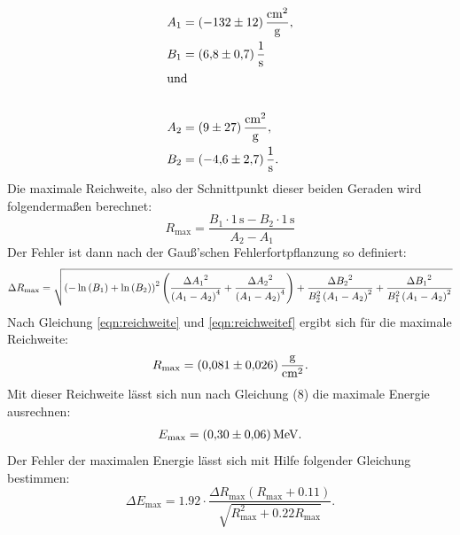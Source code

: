 \begin{align*}
A_1 &= (\num{-132 +- 12})\,\frac{\si{\centi\meter\squared}}{\si{\gram}} ,\\
B_1 &= (\num{6.8 +- 0.7})\,\frac{1}{\si{\second}} \\
\intertext{und} \\
A_2 &= (\num{9 +- 27})\,\frac{\si{\centi\meter\squared}}{\si{\gram}} ,\\
B_2 &= (\num{-4.6 +- 2.7})\,\frac{1}{\si{\second}}.
\end{align*}
Die maximale Reichweite, also der Schnittpunkt dieser beiden Geraden wird folgendermaßen berechnet:
\begin{equation}
  \label{eqn:reichweite}
R_\text{max} = \frac{B_1 \cdot 1\,\si{\second} - B_2 \cdot 1\,\si{\second}}{A_2 - A_1}
\end{equation}
Der Fehler ist dann nach der Gauß'schen Fehlerfortpflanzung so definiert:
\begin{equation}
  \tiny
\label{eqn:reichweitef}
\Delta R_\text{max} = \sqrt{\left(- \ln{\left (B_{1} \right )} +
\ln{\left (B_{2} \right )}\right)^{2} \left( \frac{\Delta{A_{1}}^{2}}{\left(A_{1} - A_{2}\right)^{4}} + \frac{\Delta{A_{2}}^{2}}{\left(A_{1} - A_{2}\right)^{4}} \right)
 + \frac{\Delta{B_{2}}^{2}}{B_{2}^{2}
\left(A_{1} - A_{2}\right)^{2}} + \frac{\Delta{B_{1}}^{2}}{B_{1}^{2} \left(A_{1} - A_{2}\right)^{2}}}
\end{equation}
Nach Gleichung \eqref{eqn:reichweite} und \eqref{eqn:reichweitef} ergibt sich für die maximale Reichweite:
\begin{align*}
R_\text{max} = (\num{0.081 +- 0.026})\,\frac{\si{\gram}}{\si{\centi\meter\squared}}.
\end{align*}
Mit dieser Reichweite lässt sich nun nach Gleichung (8) die maximale Energie ausrechnen:
\begin{align*}
E_\text{max} = (\num{0.30 +- 0.06})\,\si{\mega\electronvolt}.
\end{align*}
Der Fehler der maximalen Energie lässt sich mit Hilfe folgender Gleichung bestimmen:
\begin{equation}
\Delta E_\text{max} = 1.92 \cdot \frac{\Delta R_\text{max} \left(R_\text{max} + 0.11\right)}{\sqrt{R_\text{max}^{2} + 0.22 R_\text{max}}}.
\end{equation}
